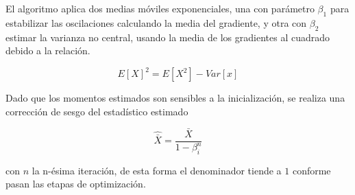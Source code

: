 		El algoritmo aplica dos medias móviles exponenciales, una con parámetro $\beta_1$ para estabilizar las oscilaciones calculando la media del gradiente, y otra con $\beta_2$ estimar la varianza no central, usando la media de los gradientes al cuadrado debido a la relación.
		
		\begin{equation}
			E[X]^2 = E[X^2]	- Var[x]
		\end{equation}
		
		Dado que los momentos estimados son sensibles a la inicialización, se realiza una corrección de sesgo del estadístico estimado
		
		\begin{equation}
			\hat{\bar{X}} = \frac{\bar{X}}{1-\beta_i^n}
		\end{equation}
		
		con $n$ la n-ésima iteración, de esta forma el denominador tiende a $1$ conforme pasan las etapas de optimización.
